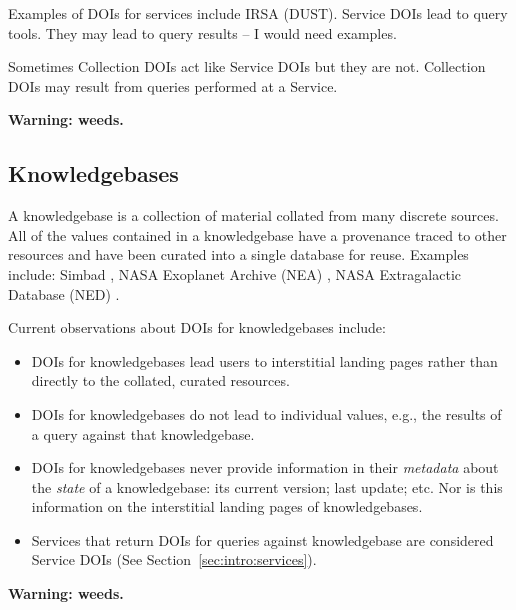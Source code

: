 \documentclass[11pt,a4paper]{ivoa}
\begin{document}
Examples of DOIs for services include IRSA (DUST).
Service DOIs lead to query tools.
They may lead to query results -- I would need examples.

Sometimes Collection DOIs act like Service DOIs but they are not.
Collection DOIs may result from queries performed at a Service.

\textbf{Warning: weeds.}

\subsection{Knowledgebases}
\label{sec:intro:kdbs}

A knowledgebase is a collection of material collated from many discrete sources.
All of the values contained in a knowledgebase have a provenance traced to other resources and have been curated into a single database for reuse.
Examples include: Simbad \citep[as originally described in, ][]{2000A&AS..143....9W}, NASA Exoplanet Archive (NEA) \citep{NEA12-doi2bib} \citep[as originally described in,][]{2013PASP..125..989A}, NASA Extragalactic Database (NED) \citep{NED1-doi2bib} \citep[as originally described in,][]{1991ASSL..171...89H}. 

Current observations about DOIs for knowledgebases include:
\begin{itemize}
\item DOIs for knowledgebases lead users to interstitial landing pages rather than directly to the collated, curated resources.
\item DOIs for knowledgebases do not lead to individual values, e.g., the results of a query against that knowledgebase.
\item DOIs for knowledgebases never provide information in their \textit{metadata} about the \textit{state} of a knowledgebase: its current version; last update; etc. 
Nor is this information on the interstitial landing pages of knowledgebases.
\item Services that return DOIs for queries against knowledgebase are considered Service DOIs (See Section~\ref{sec:intro:services}).
\end{itemize}
\textbf{Warning: weeds.}
\end{document}
